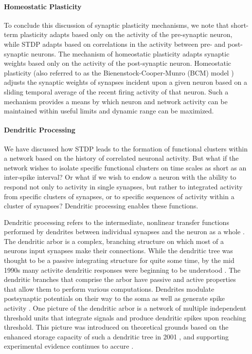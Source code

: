 \documentclass[twocolumn]{article}
\begin{document}
\paragraph{Homeostatic Plasticity}
To conclude this discussion of synaptic plasticity mechanisms, we note that short-term plasticity adapts based only on the activity of the pre-synaptic neuron, while STDP adapts based on correlations in the activity between pre- and post-synaptic neurons. The mechanism of homeostatic plasticity \cite{cube2012} adapts synaptic weights based only on the activity of the post-synaptic neuron. Homeostatic plasticity (also referred to as the Bienenstock-Cooper-Munro (BCM) model \cite{bico1982}) adjusts the synaptic weights of synapses incident upon a given neuron based on a sliding temporal average of the recent firing activity of that neuron. Such a mechanism provides a means by which neuron and network activity can be maintained within useful limits and dynamic range can be maximized.

\paragraph{\label{sec:dendritic_processing}Dendritic Processing}
We have discussed how STDP leads to the formation of functional clusters within a network based on the history of correlated neuronal activity. But what if the network wishes to isolate specific functional clusters on time scales as short as an inter-spike interval? Or what if we wish to endow a neuron with the ability to respond not only to activity in single synapses, but rather to integrated activity from specific clusters of synapses, or to specific sequences of activity within a cluster of synapses? Dendritic processing enables these functions.

Dendritic processing refers to the intermediate, nonlinear transfer functions performed by dendrites between individual synapses and the neuron as a whole \cite{stsp2015}. The dendritic arbor is a complex, branching structure on which most of a neurons input synapses make their connections. While the dendritic tree was thought to be a passive integrating structure for quite some time, by the mid 1990s many activite dendritic responses were beginning to be understood \cite{joma1996}. The dendritic branches that comprise the arbor have passive and active properties that allow them to perform various computations. Dendrites modulate postsynaptic potentials on their way to the soma as well as generate spike activity \cite{majo2005,hoko2006}. One picture of the dendritic arbor is a network of multiple independent threshold units that integrate signals and produce dendritic spikes upon reaching threshold. This picture was introduced on theoretical grounds based on the enhanced storage capacity of such a dendritic tree in 2001 \cite{pome2001}, and supporting experimental evidence continues to accure \cite{sava2017}.
\end{document}
